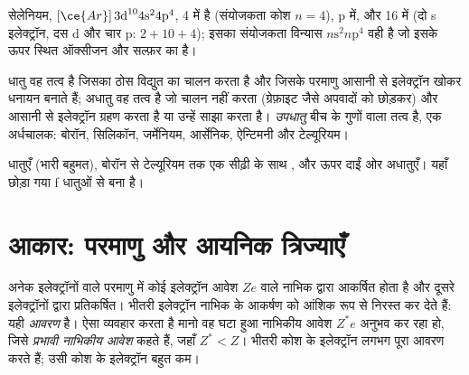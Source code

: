 \begin{example}[स्थिति पढ़ना]\label{ex:b1:periodicity:position}
सेलेनियम, $[\ce{Ar}]\,3\text{d}^{10} 4\text{s}^2 4\text{p}^4$,  4 में
है (संयोजकता कोश $n = 4$), p  में, और  16 में (दो s
इलेक्ट्रॉन, दस d और चार p: $2 + 10 + 4$); इसका संयोजकता विन्यास
$n\text{s}^2 n\text{p}^4$ वही है जो इसके ऊपर स्थित ऑक्सीजन और सल्फ़र का है।
\end{example}

\begin{definition}[धातु, अधातु, उपधातु]\label{def:b1:periodicity:metalloid}
धातु वह तत्व है जिसका ठोस विद्युत का चालन करता है और जिसके परमाणु आसानी से
इलेक्ट्रॉन खोकर धनायन बनाते हैं; अधातु वह तत्व है जो चालन नहीं करता
(ग्रेफ़ाइट जैसे अपवादों को छोड़कर) और आसानी से इलेक्ट्रॉन ग्रहण करता है या उन्हें
साझा करता है। \emph{उपधातु} बीच के गुणों वाला
तत्व है, एक अर्धचालक: बोरॉन, सिलिकॉन, जर्मेनियम, आर्सेनिक, ऐन्टिमनी और
टेल्यूरियम।
\end{definition}

\begin{omfigure}
\omperiodictable[colour=metals, legend, f block=false]

{\small धातुएँ (भारी बहुमत), बोरॉन से टेल्यूरियम तक एक सीढ़ी के साथ ,
और ऊपर दाईं ओर अधातुएँ। यहाँ छोड़ा गया f  धातुओं से बना है।}
\end{omfigure}

\section{आकार: परमाणु और आयनिक त्रिज्याएँ}

\begin{definition}[आवरण, प्रभावी नाभिकीय आवेश]\label{def:b1:periodicity:screening}
अनेक इलेक्ट्रॉनों वाले परमाणु में कोई इलेक्ट्रॉन आवेश $Ze$ वाले नाभिक द्वारा
आकर्षित होता है और दूसरे इलेक्ट्रॉनों द्वारा प्रतिकर्षित। भीतरी
इलेक्ट्रॉन नाभिक के आकर्षण को आंशिक रूप से निरस्त कर देते हैं: यही
\emph{आवरण} है।  ऐसा व्यवहार करता है मानो वह
घटा हुआ नाभिकीय आवेश $Z^{*}e$ अनुभव कर रहा हो, जिसे \emph{प्रभावी नाभिकीय
आवेश} कहते हैं, जहाँ $Z^{*} < Z$। भीतरी कोश के
इलेक्ट्रॉन लगभग पूरा आवरण करते हैं; उसी कोश के इलेक्ट्रॉन
बहुत कम।
\end{definition}

